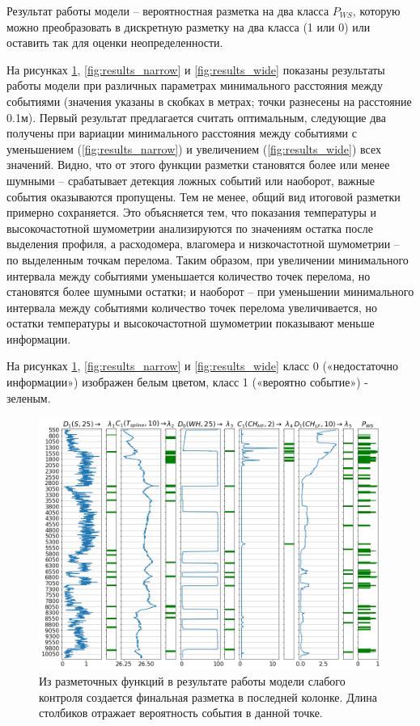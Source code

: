 \par
Результат работы модели – вероятностная разметка на два класса $P_{WS}$, которую можно преобразовать в дискретную разметку на два класса (1 или 0) или оставить так для оценки неопределенности. 
\par
На рисунках \ref{fig:results_optimal}, \ref{fig:results_narrow} и \ref{fig:results_wide} показаны результаты работы модели при различных параметрах минимального расстояния между событиями (значения указаны в скобках в метрах; точки разнесены на расстояние 0.1м). Первый результат предлагается считать оптимальным, следующие два получены при вариации минимального расстояния между событиями с уменьшением (\ref{fig:results_narrow}) и увеличением (\ref{fig:results_wide}) всех значений. Видно, что от этого функции разметки становятся более или менее шумными – срабатывает детекция ложных событий или наоборот, важные события оказываются пропущены. Тем не менее, общий вид итоговой разметки примерно сохраняется. Это объясняется тем, что показания температуры и высокочастотной шумометрии анализируются по значениям остатка после выделения профиля, а расходомера, влагомера и низкочастотной шумометрии – по выделенным точкам перелома. Таким образом, при увеличении минимального интервала между событиями уменьшается количество точек перелома, но становятся более шумными остатки; и наоборот – при уменьшении минимального интервала между событиями количество точек перелома увеличивается, но остатки температуры и высокочастотной шумометрии показывают меньше информации. 
\par
На рисунках \ref{fig:results_optimal}, \ref{fig:results_narrow} и \ref{fig:results_wide} класс 0 («недостаточно информации») изображен белым цветом, класс 1 («вероятно событие») - зеленым.


\begin{figure}[H]
\centering
\includegraphics[width=1.0\textwidth]{WS/results_optimal.png}
\caption{Из разметочных функций в результате работы модели слабого контроля создается финальная разметка в последней колонке. Длина столбиков отражает вероятность события в данной точке.}
\label{fig:results_optimal}
\end{figure}

